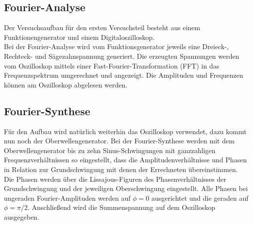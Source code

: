 \subsection{Fourier-Analyse}
Der Versuchsaufbau für den ersten Versuchsteil besteht aus einem Funktionengenerator und einem Digitaloszilloskop. \\
Bei der Fourier-Analyse wird vom Funktionsgenerator jeweils eine Dreieck-, Rechteck- und Sägezahnspannung generiert. Die erzeugten Spannungen werden vom Oszilloskop mittels einer Fast-Fourier-Transformation (FFT) in das Frequenzspektrum umgerechnet und angezeigt. Die Amplituden und Frequenzen können am Oszilloskop abgelesen werden.
\subsection{Fourier-Synthese}
Für den Aufbau wird natürlich weiterhin das Oszilloskop verwendet, dazu kommt nun noch der Oberwellengenerator.
Bei der Fourier-Synthese werden mit dem Oberwellengenerator bis zu zehn Sinus-Schwingungen mit ganzzahligen Frequenzverhältnissen so eingestellt, dass die Amplitudenverhältnisse und Phasen in Relation zur Grundschwingung mit denen der Errechneten übereinstimmen. \\
Die Phasen werden über die Lissajous-Figuren des Phasenverhältnisses der Grundschwingung und der jeweiligen Oberschwingung eingestellt. Alle Phasen bei ungeraden Fourier-Amplituden werden auf $\phi = 0$ ausgerichtet und die geraden auf $\phi = \pi/2$.
Anschließend wird die Summenspannung auf dem Oszilloskop ausgegeben.
